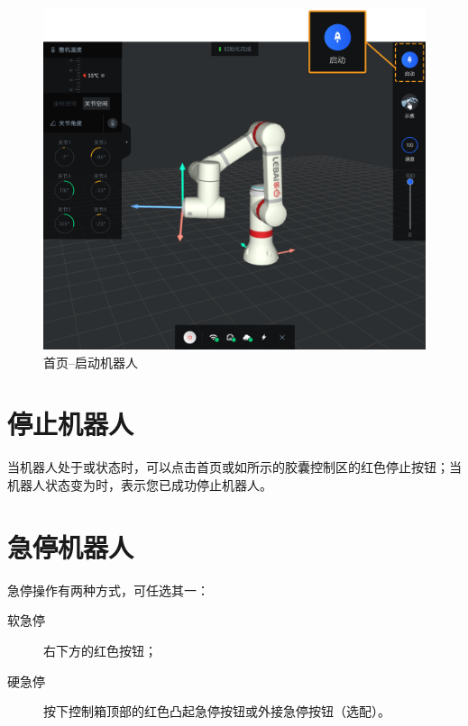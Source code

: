 \begin{figure}[ht]
	\centering
	\includegraphics[width=\textwidth]{screen/2-16.png}
	\caption{\LM  首页--启动机器人}
	\label{fig:启动机器人}
\end{figure}

\section{停止机器人}
当机器人处于或状态时，可以点击首页或如所示的胶囊控制区的红色停止按钮；当机器人状态变为时，表示您已成功停止机器人。


\section{急停机器人}

急停操作有两种方式，可任选其一：
\begin{description}
	\item[软急停] \LM 右下方的红色按钮；
	\item[硬急停] 按下控制箱顶部的红色凸起急停按钮或外接急停按钮（选配）。
\end{description}

